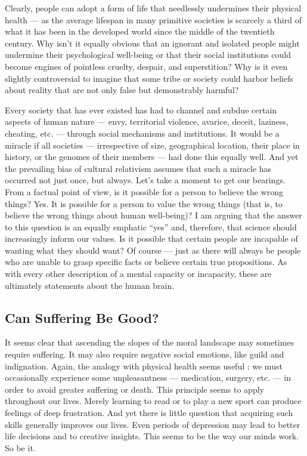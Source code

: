 \documentclass[a4paper,14pt]{extarticle}
\begin{document}
Clearly, people can adopt a form of life that needlessly undermines their physical health --- as the average lifespan in many primitive societies is scarcely a third of what it has been in the developed world since the middle of the twentieth century.
Why isn't it equally obvious that an ignorant and isolated people might undermine their psychological well-being or that their social institutions could become engines of pointless cruelty, despair, and superstition?
Why is it even slightly controversial to imagine that some tribe or society could harbor beliefs about reality that are not only false but demonstrably harmful?

Every society that has ever existed has had to channel and subdue certain aspects of human nature --- envy, territorial violence, avarice, deceit, laziness, cheating, etc. --- through social mechanisms and institutions.
It would be a miracle if all societies --- irrespective of size, geographical location, their place in history, or the genomes of their members --- had done this equally well.
And yet the prevailing bias of cultural relativism assumes that such a miracle has occurred not just once, but always.
Let's take a moment to get our bearings.
From a factual point of view, is it possible for a person to believe the wrong things?
Yes.
It is possible for a person to value the wrong things (that is, to believe the wrong things about human well-being)?
I am arguing that the answer to this question is an equally emphatic ``yes'' and, therefore, that science should increasingly inform our values.
Is it possible that certain people are incapable of wanting what they should want?
Of course --- just as there will always be people who are unable to grasp specific facts or believe certain true propositions.
As with every other description of a mental capacity or incapacity, these are ultimately statements about the human brain.

\subsection{Can Suffering Be Good?}

It seems clear that ascending the slopes of the moral landscape may sometimes require suffering.
It may also require negative social emotions, like guild and indignation.
Again, the analogy with physical health seems useful :
we must occasionally experience some unpleasantness --- medication, surgery, etc. --- in order to avoid greater suffering or death.
This principle seems to apply throughout our lives.
Merely learning to read or to play a new sport can produce feelings of deep frustration.
And yet there is little question that acquiring such skills generally improves our lives.
Even periods of depression may lead to better life decisions and to creative insights.
This seems to be the way our minds work.
So be it.
\end{document}
